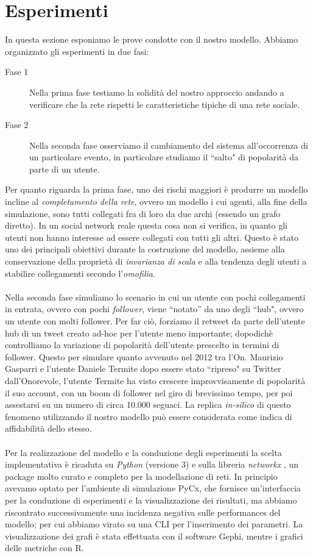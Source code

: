 \documentclass[a4paper,12pt]{article}
\begin{document}
\section{Esperimenti}
\label{sec:esp}
In questa sezione esponiamo le prove condotte con il nostro modello. 
Abbiamo organizzato gli esperimenti in due fasi: 
\begin{description}
\item[Fase 1] Nella prima fase testiamo la solidità del nostro approccio andando a verificare che la rete rispetti le caratteristiche tipiche di una rete sociale.
\item[Fase 2] Nella seconda fase osserviamo il cambiamento del sistema all'occorrenza di un particolare evento, in particolare studiamo il ``salto" di popolarità da parte di un utente.
\end{description}
Per quanto riguarda la prima fase, uno dei rischi maggiori è produrre un modello incline al \textit{completamento della rete}, ovvero un modello i cui agenti, alla fine della simulazione, sono tutti collegati fra di loro da due archi (essendo un grafo diretto). In un social network reale questa cosa non si verifica, in quanto gli utenti non hanno interesse ad essere collegati con tutti gli altri. Questo è stato uno dei principali obiettivi durante la costruzione del modello, assieme alla conservazione della proprietà di \textit{invarianza di scala} e alla tendenza degli utenti a stabilire collegamenti secondo l'\textit{omofilia}. 
\\
\\
Nella seconda fase simuliamo lo scenario in cui un utente con pochi collegamenti in entrata, ovvero con pochi \textit{follower}, viene ``notato'' da uno degli ``hub", ovvero un utente con molti follower. Per far ciò, forziamo il retweet da parte dell'utente hub di un tweet creato ad-hoc per l'utente meno importante; dopodichè controlliamo la variazione di popolarità  dell'utente prescelto in termini di follower. Questo per simulare quanto avvenuto nel 2012 tra l'On. Maurizio Gasparri e l'utente Daniele Termite \cite{termite} dopo essere stato ``ripreso" su Twitter dall'Onorevole, l'utente Termite ha visto crescere improvvisamente di popolarità il suo account, con un boom di follower nel giro di brevissimo tempo, per poi assestarsi su un numero di circa 10.000 seguaci. La replica \textit{in-silico} di questo fenomeno utilizzando il nostro modello può essere considerata come indica di affidabilità dello stesso.
\\
\\
Per la realizzazione del modello e la conduzione degli esperimenti la scelta implementativa è ricaduta su \textit{Python} (versione 3) e sulla libreria \textit{networkx} \cite{nx}, un package molto curato e completo per la modellazione di reti. In principio avevamo optato per l'ambiente di simulazione PyCx, che fornisce un'interfaccia per la conduzione di esperimenti e la visualizzazione dei risultati, ma abbiamo riscontrato successivamente una incidenza negativa sulle performances del modello; per cui abbiamo virato su una CLI per l'inserimento dei parametri. La visualizzazione dei grafi è stata effettuata con il software Gephi, mentre i grafici delle metriche con R.
\end{document}
